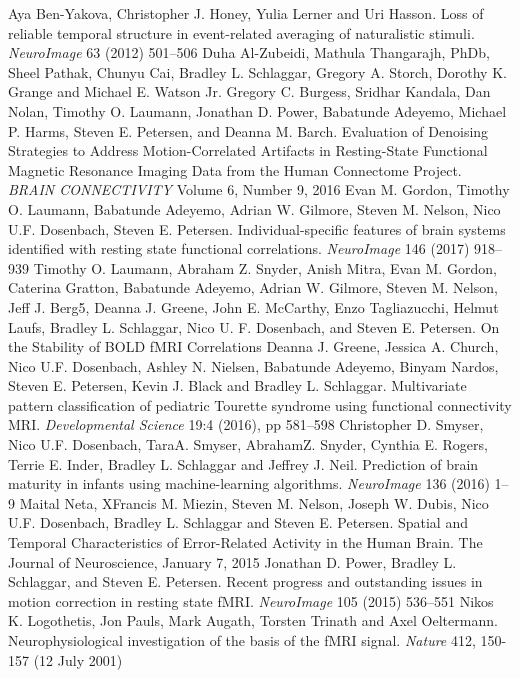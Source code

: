 \documentclass[11pt]{article}
\begin{document}
\begin{thebibliography}{1}
 Aya Ben-Yakova, Christopher J. Honey, Yulia Lerner and Uri Hasson. Loss of reliable temporal structure in event-related averaging of naturalistic stimuli. \textit{NeuroImage} 63 (2012) 501–506
 Duha Al-Zubeidi, Mathula Thangarajh, PhDb, Sheel Pathak, Chunyu Cai, Bradley L. Schlaggar, Gregory A. Storch, Dorothy K. Grange and Michael E. Watson Jr.
 Gregory C. Burgess, Sridhar Kandala, Dan Nolan, Timothy O. Laumann, Jonathan D. Power, Babatunde Adeyemo, Michael P. Harms, Steven E. Petersen, and Deanna M. Barch. Evaluation of Denoising Strategies to Address Motion-Correlated Artifacts in Resting-State Functional Magnetic Resonance Imaging Data from the Human Connectome Project. \textit{BRAIN CONNECTIVITY} Volume 6, Number 9, 2016
 Evan M. Gordon, Timothy O. Laumann, Babatunde Adeyemo, Adrian W. Gilmore, Steven M. Nelson, Nico U.F. Dosenbach, Steven E. Petersen. Individual-specific features of brain systems identified with resting state functional correlations. \textit{NeuroImage} 146 (2017) 918–939
 Timothy O. Laumann, Abraham Z. Snyder, Anish Mitra, Evan M. Gordon, Caterina Gratton, Babatunde Adeyemo, Adrian W. Gilmore, Steven M. Nelson, Jeff J. Berg5, Deanna J. Greene, John E. McCarthy, Enzo Tagliazucchi, Helmut Laufs, Bradley L. Schlaggar, Nico U. F. Dosenbach, and Steven E. Petersen. On the Stability of BOLD fMRI Correlations
 Deanna J. Greene, Jessica A. Church, Nico U.F. Dosenbach, Ashley N. Nielsen, Babatunde Adeyemo, Binyam Nardos, Steven E. Petersen, Kevin J. Black and Bradley L. Schlaggar. Multivariate pattern classification of pediatric Tourette syndrome using functional connectivity MRI. \textit{Developmental Science} 19:4 (2016), pp 581–598
 Christopher D. Smyser, Nico U.F. Dosenbach, TaraA. Smyser, AbrahamZ. Snyder, Cynthia E. Rogers, Terrie E. Inder, Bradley L. Schlaggar and Jeffrey J. Neil. Prediction of brain maturity in infants using machine-learning algorithms. \textit{NeuroImage} 136 (2016) 1–9
 Maital Neta, XFrancis M. Miezin, Steven M. Nelson, Joseph W. Dubis, Nico U.F. Dosenbach, Bradley L. Schlaggar and Steven E. Petersen. Spatial and Temporal Characteristics of Error-Related Activity in the Human Brain. The Journal of Neuroscience, January 7, 2015
 Jonathan D. Power, Bradley L. Schlaggar, and Steven E. Petersen. Recent progress and outstanding issues in motion correction in resting state fMRI. \textit{NeuroImage} 105 (2015) 536–551
 Nikos K. Logothetis, Jon Pauls, Mark Augath, Torsten Trinath and Axel Oeltermann. Neurophysiological investigation of the basis of the fMRI signal. \textit{Nature} 412, 150-157 (12 July 2001)

\end{thebibliography}
\end{document}
